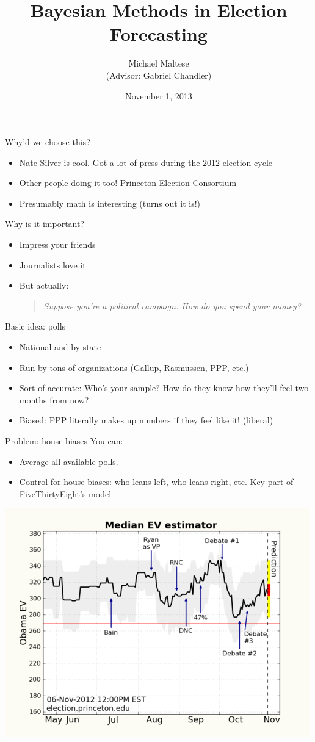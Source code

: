 \documentclass[14pt]{beamer}
\title{\textbf{Bayesian Methods in Election Forecasting}}
\author{Michael Maltese \\ (Advisor: Gabriel Chandler)}
\date{November 1, 2013}
\newcommand{\bi}{\begin{itemize}}
\newcommand{\ei}{\end{itemize}}
\begin{document}
\begin{frame}
\titlepage
\end{frame}

\begin{frame}[t]{Why'd we choose this?}
\bi
\item Nate Silver is cool. Got a lot of press during the 2012 election cycle
\item Other people doing it too! Princeton Election Consortium
\item Presumably math is interesting (turns out it is!)
\ei
\end{frame}

\begin{frame}[t]{Why is it important?}
\bi
\item Impress your friends
\item Journalists love it
\item But actually: \\ \begin{quote}\emph{Suppose you're a political campaign. How do you spend your money?}\end{quote}
\ei
\end{frame}

\begin{frame}[t]{Basic idea: polls}
\bi
\item National and by state
\item Run by tons of organizations (Gallup, Rasmussen, PPP, etc.)
\item Sort of accurate: Who's your sample? How do they know how they'll feel two months from now?
\item Biased: PPP literally makes up numbers if they feel like it! (liberal)
\ei
\end{frame}

\begin{frame}[t]{Problem: house biases}
You can:
\bi
\item Average all available polls.
\item Control for house biases: who leans left, who leans right, etc. Key part of FiveThirtyEight's model
\ei
\end{frame}

\begin{frame}
\includegraphics[width=\textwidth]{EV_history.png}
\end{frame}
\end{document}
